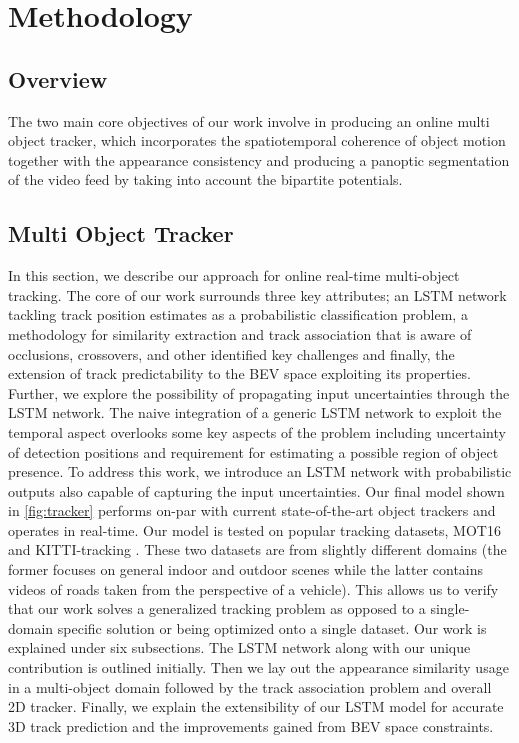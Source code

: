 \chapter{Methodology}
\label{chapter:method}

\section{Overview}
The two main core objectives of our work involve in producing an online multi object tracker, which incorporates the spatiotemporal coherence of object motion together with the appearance consistency and producing a panoptic segmentation of the video feed by taking into account the bipartite potentials.

\section{Multi Object Tracker}

In this section, we describe our approach for online real-time multi-object tracking. The core of our work surrounds three key attributes; an LSTM network tackling track position estimates as a probabilistic classification problem, a methodology for similarity extraction and track association that is aware of occlusions, crossovers, and other identified key challenges and finally, the extension of track predictability to the BEV space exploiting its properties. Further, we explore the possibility of propagating input uncertainties through the LSTM network. The naive integration of a generic LSTM network to exploit the temporal aspect overlooks some key aspects of the problem including uncertainty of detection positions and requirement for estimating a possible region of object presence. To address this work, we introduce an LSTM network with probabilistic outputs also capable of capturing the input uncertainties. Our final model shown in \ref{fig:tracker} performs on-par with current state-of-the-art object trackers and operates in real-time. Our model is tested on popular tracking datasets, MOT16 \cite{DeepSiam:MilanL0RS16} and KITTI-tracking \cite{DeepSiam:KITTI}. These two datasets are from slightly different domains (the former focuses on general indoor and outdoor scenes while the latter contains videos of roads taken from the perspective of a vehicle). This allows us to verify that our work solves a generalized tracking problem as opposed to a single-domain specific solution or being optimized onto a single dataset. Our work is explained under six subsections. The LSTM network along with our unique contribution is outlined initially. Then we lay out the appearance similarity usage in a multi-object domain followed by the track association problem and overall 2D tracker. Finally, we explain the extensibility of our LSTM model for accurate 3D track prediction and the improvements gained from BEV space constraints.


